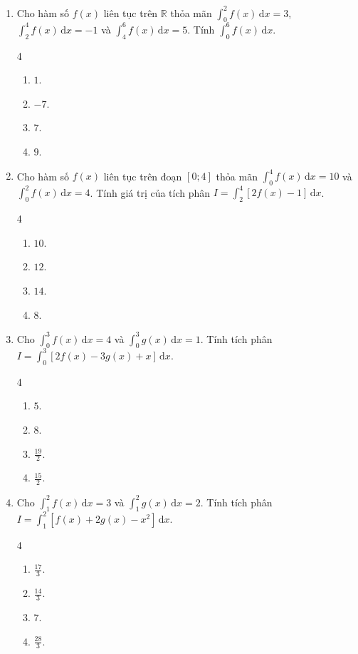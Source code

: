 \documentclass[12pt]{article}
\begin{document}
\begin{enumerate}[label=\textbf{Câu \arabic*.}]
		\item Cho hàm số $f(x)$ liên tục trên $\mathbb{R}$ thỏa mãn $\displaystyle \int_0^2 f(x)\,\mathrm{d}x = 3$, $\displaystyle \int_2^4 f(x)\,\mathrm{d}x = -1$ và $\displaystyle \int_4^6 f(x)\,\mathrm{d}x = 5$. Tính $\displaystyle \int_0^6 f(x)\,\mathrm{d}x$.
		\begin{multicols}{4}
			\begin{enumerate}[label=\textbf{\Alph*.}]
				\item $1$.
				\item $-7$.
				\item $7$.
				\item $9$.
			\end{enumerate}
		\end{multicols}
		
		\item Cho hàm số $f(x)$ liên tục trên đoạn $[0; 4]$ thỏa mãn $\displaystyle \int_0^4 f(x)\,\mathrm{d}x = 10$ và $\displaystyle \int_0^2 f(x)\,\mathrm{d}x = 4$. Tính giá trị của tích phân $I = \displaystyle \int_2^4 [2f(x) - 1]\,\mathrm{d}x$.
		\begin{multicols}{4}
			\begin{enumerate}[label=\textbf{\Alph*.}]
				\item $10$.
				\item $12$.
				\item $14$.
				\item $8$.
			\end{enumerate}
		\end{multicols}
		
		\item Cho $\displaystyle \int_0^3 f(x)\,\mathrm{d}x = 4$ và $\displaystyle \int_0^3 g(x)\,\mathrm{d}x = 1$. Tính tích phân $I = \displaystyle \int_0^3 [2f(x) - 3g(x) + x]\,\mathrm{d}x$.
		\begin{multicols}{4}
			\begin{enumerate}[label=\textbf{\Alph*.}]
				\item $5$.
				\item $8$.
				\item $\displaystyle \frac{19}{2}$.
				\item $\displaystyle \frac{15}{2}$.
			\end{enumerate}
		\end{multicols}
		
		\item Cho $\displaystyle \int_1^2 f(x)\,\mathrm{d}x = 3$ và $\displaystyle \int_1^2 g(x)\,\mathrm{d}x = 2$. Tính tích phân $I = \displaystyle \int_1^2 [f(x) + 2g(x) - x^2]\,\mathrm{d}x$.
		\begin{multicols}{4}
			\begin{enumerate}[label=\textbf{\Alph*.}]
				\item $\displaystyle \frac{17}{3}$.
				\item $\displaystyle \frac{14}{3}$.
				\item $7$.
				\item $\displaystyle \frac{28}{3}$.
			\end{enumerate}
		\end{multicols}
		

\end{enumerate}
\end{document}
